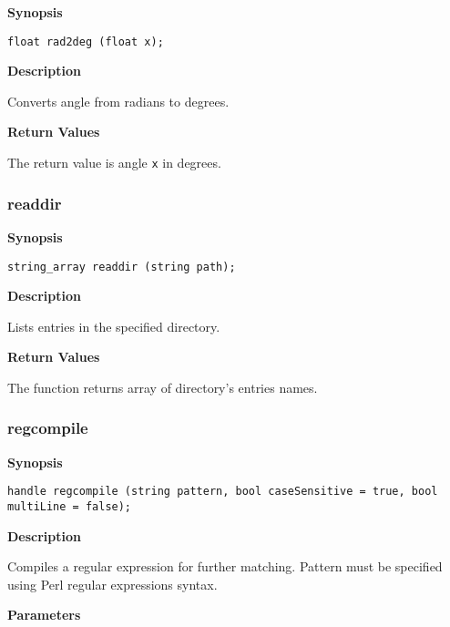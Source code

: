 \documentclass[a4paper, 10pt, titlepage]{article}
\begin{document}
\textbf{Synopsis}

\begin{verbatim}
float rad2deg (float x);
\end{verbatim}

\textbf{Description}

Converts angle from radians to degrees.

\textbf{Return Values}

The return value is angle \texttt{x} in degrees.

\subsubsection{readdir}

\textbf{Synopsis}

\begin{verbatim}
string_array readdir (string path);
\end{verbatim}

\textbf{Description}

Lists entries in the specified directory.

\textbf{Return Values}

The function returns array of directory's entries names.

\subsubsection{regcompile}

\textbf{Synopsis}

\begin{verbatim}
handle regcompile (string pattern, bool caseSensitive = true, bool multiLine = false);
\end{verbatim}

\textbf{Description}

Compiles a regular expression for further matching. Pattern must be specified using Perl regular expressions syntax.

\textbf{Parameters}
\end{document}
